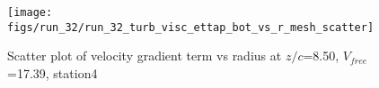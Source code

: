 \begin{figure}[H]
\centering
\texttt{[image: figs/run\_32/run\_32\_turb\_visc\_ettap\_bot\_vs\_r\_mesh\_scatter]}
\caption{Scatter plot of velocity gradient term vs radius at $z/c$=8.50, $V_{free}$=17.39, station4}
\label{fig:run_32_turb_visc_ettap_bot_vs_r_mesh_scatter}
\end{figure}


